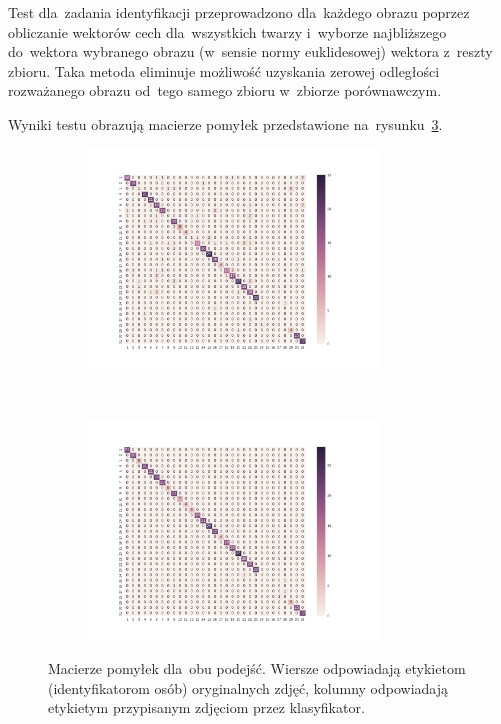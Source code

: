\documentclass[11pt,a4paper]{article}
\begin{document}
Test dla~zadania identyfikacji przeprowadzono dla~każdego obrazu poprzez obliczanie wektorów cech dla~wszystkich twarzy i~wyborze najbliższego do~wektora wybranego obrazu (w~sensie normy euklidesowej) wektora z~reszty zbioru.
Taka metoda eliminuje możliwość uzyskania zerowej odległości rozważanego obrazu od~tego samego zbioru w~zbiorze porównawczym.

Wyniki testu obrazują macierze pomyłek przedstawione na~rysunku~\ref{fig:confusion-matrix}.

\begin{figure}[H]
    \begin{subfigure}{\textwidth}
        \centering
        \includegraphics[width=0.85\textwidth]{res/img/normalized_confusion_matrix.pdf}
        \label{subfig:normalized-distance-matrix}
    \end{subfigure}
    \\
    \begin{subfigure}{\textwidth}
        \centering
        \includegraphics[width=0.85\textwidth]{res/img/resnet_confusion_matrix.pdf}
        \label{subfig:resnet-distance-matrix}
    \end{subfigure}
    \caption{Macierze pomyłek dla~obu podejść.
    Wiersze odpowiadają etykietom (identyfikatorom osób) oryginalnych zdjęć,
    kolumny odpowiadają etykietym przypisanym zdjęciom przez klasyfikator.}
    \label{fig:confusion-matrix}
\end{figure}
\end{document}
